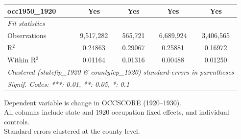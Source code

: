 \begin{table}[htbp]
\begin{tabular}{lcccc}
      occ1950\_1920   & Yes             & Yes             & Yes                     & Yes\\  
      \midrule
      \emph{Fit statistics}\\
      Observations    & 9,517,282       & 565,721         & 6,689,924               & 3,406,565\\  
      R$^2$           & 0.24863         & 0.29067         & 0.25881                 & 0.16972\\  
      Within R$^2$    & 0.01164         & 0.01316         & 0.00488                 & 0.01250\\  
      \midrule \midrule
      \multicolumn{5}{l}{\emph{Clustered (statefip\_1920 \& countyicp\_1920) standard-errors in parentheses}}\\
      \multicolumn{5}{l}{\emph{Signif. Codes: ***: 0.01, **: 0.05, *: 0.1}}\\
   \end{tabular}
   
   \par \raggedright 
   Dependent variable is change in OCCSCORE (1920--1930).\\
   All columns include state and 1920 occupation fixed effects, and individual controls.\\
   Standard errors clustered at the county level.
\end{table}


